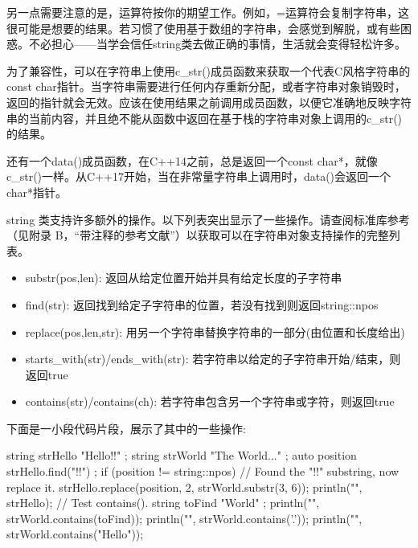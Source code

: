另一点需要注意的是，运算符按你的期望工作。例如，=运算符会复制字符串，这很可能是想要的结果。若习惯了使用基于数组的字符串，会感觉到解脱，或有些困惑。不必担心——当学会信任string类去做正确的事情，生活就会变得轻松许多。


为了兼容性，可以在字符串上使用c\_str()成员函数来获取一个代表C风格字符串的const char指针。当字符串需要进行任何内存重新分配，或者字符串对象销毁时，返回的指针就会无效。应该在使用结果之前调用成员函数，以便它准确地反映字符串的当前内容，并且绝不能从函数中返回在基于栈的字符串对象上调用的c\_str()的结果。

还有一个data()成员函数，在C++14之前，总是返回一个const char*，就像c\_str()一样。从C++17开始，当在非常量字符串上调用时，data()会返回一个char*指针。


string 类支持许多额外的操作。以下列表突出显示了一些操作。请查阅标准库参考（见附录 B，“带注释的参考文献”）以获取可以在字符串对象支持操作的完整列表。


\begin{itemize}
\item
substr(pos,len): 返回从给定位置开始并具有给定长度的子字符串

\item
find(str): 返回找到给定子字符串的位置，若没有找到则返回string::npos

\item
replace(pos,len,str): 用另一个字符串替换字符串的一部分(由位置和长度给出)

\item
starts\_with(str)/ends\_with(str): 若字符串以给定的子字符串开始/结束，则返回true

\item
contains(str)/contains(ch): 若字符串包含另一个字符串或字符，则返回true
\end{itemize}

下面是一小段代码片段，展示了其中的一些操作:

\begin{cpp}
string strHello { "Hello!!" };
string strWorld { "The World..." };
auto position { strHello.find("!!") };
if (position != string::npos) {
    // Found the "!!" substring, now replace it.
    strHello.replace(position, 2, strWorld.substr(3, 6));
}
println("{}", strHello);
// Test contains().
string toFind { "World" };
println("{}", strWorld.contains(toFind));
println("{}", strWorld.contains('.'));
println("{}", strWorld.contains("Hello"));
\end{cpp}

